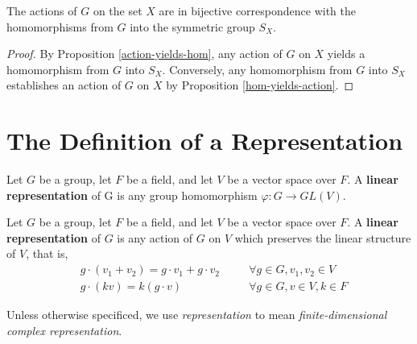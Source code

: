 \begin{prop} \label{equivalence-of-actions}
The actions of $G$ on the set $X$ are in bijective correspondence with the homomorphisms from $G$ into the symmetric group $S_X$.
\end{prop}
\begin{proof}
By Proposition \ref{action-yields-hom}, any action of $G$ on $X$ yields a homomorphism from $G$ into $S_X$.    Conversely, any homomorphism from $G$ into $S_X$ establishes an action of $G$ on $X$ by Proposition \ref{hom-yields-action}.
\end{proof}


%
\section{The Definition of a Representation}

\begin{defn}
\label{rep-def-1}
Let $G$ be a group, let $F$ be a field, and let $V$ be a vector space over $F$.  A \textbf{linear representation} of G is any group homomorphism $\varphi\colon G \to GL(V)$. \end{defn}
 

\begin{defn}\label{rep-def-2}Let $G$ be a group, let $F$ be a field, and let $V$ be a vector space over $F$. A \textbf{linear representation} of $G$ is any action of $G$ on $V$ which preserves the linear structure of $V$, that is, 
\begin{align}
\label{rep-axiom-1}&g \cdot (v_1+v_2)=g \cdot v_1+g \cdot v_2 \quad && \forall g \in G, v_1, v_2 \in V \\
\label{rep-axiom-2}&g \cdot (kv) = k (g \cdot v) \quad && \forall g \in G, v \in V, k \in F
\end{align}
 \end{defn}
 
 \begin{note}
 Unless otherwise specificed, we use \textit{representation} to mean \textit{finite-dimensional complex representation}.
 \end{note}
 
